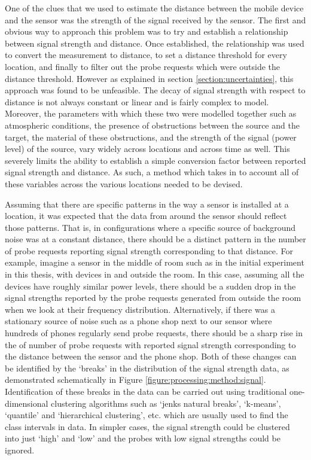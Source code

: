 One of the clues that we used to estimate the distance between the mobile device and the sensor was the strength of the signal received by the sensor.
The first and obvious way to approach this problem was to try and establish a relationship between signal strength and distance.
Once established, the relationship was used to convert the measurement to distance, to set a distance threshold for every location, and finally to filter out the probe requests which were outside the distance threshold.
However as explained in section \ref{section:uncertainties}, this approach was found to be unfeasible.
The decay of signal strength with respect to distance is not always constant or linear and is fairly complex to model.
Moreover, the parameters with which these two were modelled together such as atmospheric conditions, the presence of obstructions between the source and the target, the material of these obstructions, and the strength of the signal (power level) of the source, vary widely across locations and across time as well.
This severely limits the ability to establish a simple conversion factor between reported signal strength and distance.
As such, a method which takes in to account all of these variables across the various locations needed to be devised.

Assuming that there are specific patterns in the way a sensor is installed at a location, it was expected that the data from around the sensor should reflect those patterns.
That is, in configurations where a specific source of background noise was at a constant distance, there should be a distinct pattern in the number of probe requests reporting signal strength corresponding to that distance.
For example, imagine a sensor in the middle of room such as in the initial experiment in this thesis, with devices in and outside the room.
In this case, assuming all the devices have roughly similar power levels, there should be a sudden drop in the signal strengths reported by the probe requests generated from outside the room when we look at their frequency distribution.
Alternatively, if there was a stationary source of noise such as a phone shop next to our sensor where hundreds of phones regularly send probe requests, there should  be a sharp rise in the of number of probe requests with reported signal strength corresponding to the distance between the sensor and the phone shop.
Both of these changes can be identified by the ‘breaks’ in the distribution of the signal strength data, as demonstrated schematically in Figure \ref{figure:processing:method:signal}.
Identification of these breaks in the data can be carried out using traditional one-dimensional clustering algorithms such as ‘jenks natural breaks’, ‘k-means’, ‘quantile’ and ‘hierarchical clustering’, etc.
 which are usually used to find the class intervals in data.
In simpler cases, the signal strength could be clustered into just ‘high’ and ‘low’ and the probes with low signal strengths could be ignored.

